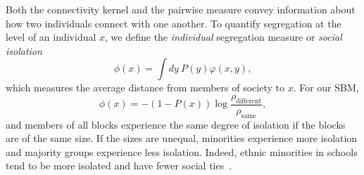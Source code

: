 \documentclass{scrartcl}
\newcommand{\titlecaption}[2]{\caption[#1]{\emph{#1} #2}}
\begin{document}
Both the connectivity kernel and the pairwise measure convey information about how two individuals connect with one another. To quantify segregation at the level of an individual $x$, we define the \emph{individual} segregation measure or \emph{social isolation}
\begin{equation}
    \phi(x) = \int dy \  P(y) \varphi(x, y),\label{eq:segregation-individual}
\end{equation}
which measures the average distance from members of society to $x$. For our SBM,
\begin{equation}
    \phi(x) = -(1-P(x))\log\frac{\rho_\mathrm{different}}{\rho_\mathrm{same}},\label{eq:segregation-individual-alien}
\end{equation}
and members of all blocks experience the same degree of isolation if the blocks are of the same size. If the sizes are unequal, minorities experience more isolation and majority groups experience less isolation. Indeed, ethnic minorities in schools tend to be more isolated and have fewer social ties~\cite{Currarini2009}.

\end{document}
